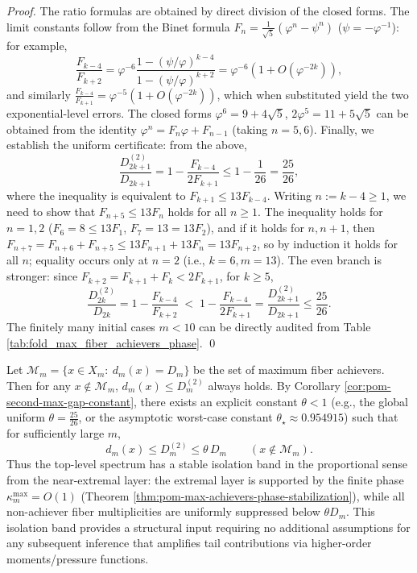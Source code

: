 \begin{proof}
The ratio formulas are obtained by direct division of the closed forms.
The limit constants follow from the Binet formula \(F_n=\frac{1}{\sqrt5}(\varphi^n-\psi^n)\) (\(\psi=-\varphi^{-1}\)): for example,
\[
\frac{F_{k-4}}{F_{k+2}}
=\varphi^{-6}\frac{1-(\psi/\varphi)^{k-4}}{1-(\psi/\varphi)^{k+2}}
=\varphi^{-6}\left(1+O(\varphi^{-2k})\right),
\]
and similarly \(\frac{F_{k-4}}{F_{k+1}}=\varphi^{-5}\left(1+O(\varphi^{-2k})\right)\), which when substituted yield the two exponential-level errors.
The closed forms \(\varphi^6=9+4\sqrt5\), \(2\varphi^5=11+5\sqrt5\) can be obtained from the identity \(\varphi^n=F_n\varphi+F_{n-1}\) (taking \(n=5,6\)).
Finally, we establish the uniform certificate: from the above,
\[
\frac{D_{2k+1}^{(2)}}{D_{2k+1}}=1-\frac{F_{k-4}}{2F_{k+1}}
\le 1-\frac{1}{26}=\frac{25}{26},
\]
where the inequality is equivalent to \(F_{k+1}\le 13F_{k-4}\).
Writing \(n:=k-4\ge 1\), we need to show that \(F_{n+5}\le 13F_n\) holds for all \(n\ge 1\).
The inequality holds for \(n=1,2\) (\(F_6=8\le 13F_1\), \(F_7=13=13F_2\)), and if it holds for \(n,n+1\), then
\(
F_{n+7}=F_{n+6}+F_{n+5}\le 13F_{n+1}+13F_n=13F_{n+2}
\),
so by induction it holds for all \(n\); equality occurs only at \(n=2\) (i.e., \(k=6,m=13\)).
The even branch is stronger: since \(F_{k+2}=F_{k+1}+F_k<2F_{k+1}\), for \(k\ge 5\),
\[
\frac{D_{2k}^{(2)}}{D_{2k}}
=1-\frac{F_{k-4}}{F_{k+2}}
\;<\;
1-\frac{F_{k-4}}{2F_{k+1}}
=\frac{D_{2k+1}^{(2)}}{D_{2k+1}}
\le \frac{25}{26}.
\]
The finitely many initial cases \(m<10\) can be directly audited from Table \ref{tab:fold_max_fiber_achievers_phase}. \qed
\end{proof}
\begin{remark}\label{rem:pom-maxfiber-isolation-band}
Let \(\mathcal{M}_m=\{x\in X_m:\ d_m(x)=D_m\}\) be the set of maximum fiber achievers.
Then for any \(x\notin\mathcal{M}_m\), \(d_m(x)\le D_m^{(2)}\) always holds.
By Corollary \ref{cor:pom-second-max-gap-constant}, there exists an explicit constant \(\theta<1\) (e.g., the global uniform \(\theta=\tfrac{25}{26}\), or the asymptotic worst-case constant \(\theta_\star\approx 0.954915\)) such that for sufficiently large \(m\),
\[
d_m(x)\le D_m^{(2)}\le \theta\,D_m\qquad(x\notin\mathcal{M}_m).
\]
Thus the top-level spectrum has a stable isolation band in the proportional sense from the near-extremal layer: the extremal layer is supported by the finite phase \(\kappa_m^{\mathrm{max}}=O(1)\) (Theorem \ref{thm:pom-max-achievers-phase-stabilization}), while all non-achiever fiber multiplicities are uniformly suppressed below \(\theta D_m\).
This isolation band provides a structural input requiring no additional assumptions for any subsequent inference that amplifies tail contributions via higher-order moments/pressure functions.
\end{remark}

